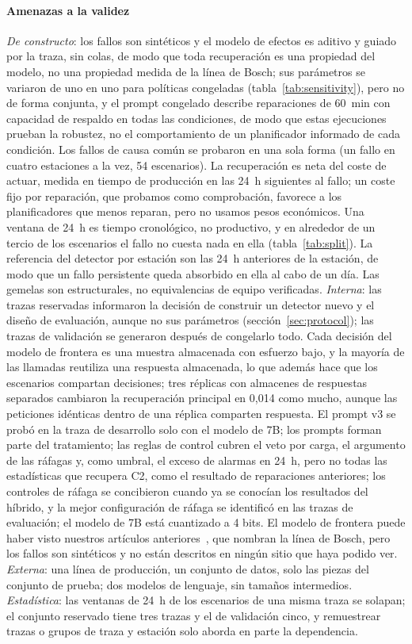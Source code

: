 \documentclass[preprint,11pt]{elsarticle}
\begin{document}
\paragraph{Amenazas a la validez}
\emph{De constructo}: los fallos son sintéticos y el modelo de efectos es aditivo y guiado por la traza, sin colas, de modo que toda recuperación es una propiedad del modelo, no una propiedad medida de la línea de Bosch; sus parámetros se variaron de uno en uno para políticas congeladas (tabla~\ref{tab:sensitivity}), pero no de forma conjunta, y el prompt congelado describe reparaciones de 60~min con capacidad de respaldo en todas las condiciones, de modo que estas ejecuciones prueban la robustez, no el comportamiento de un planificador informado de cada condición. Los fallos de causa común se probaron en una sola forma (un fallo en cuatro estaciones a la vez, 54 escenarios). La recuperación es neta del coste de actuar, medida en tiempo de producción en las 24~h siguientes al fallo; un coste fijo por reparación, que probamos como comprobación, favorece a los planificadores que menos reparan, pero no usamos pesos económicos. Una ventana de 24~h es tiempo cronológico, no productivo, y en alrededor de un tercio de los escenarios el fallo no cuesta nada en ella (tabla~\ref{tab:split}). La referencia del detector por estación son las 24~h anteriores de la estación, de modo que un fallo persistente queda absorbido en ella al cabo de un día. Las gemelas son estructurales, no equivalencias de equipo verificadas. \emph{Interna}: las trazas reservadas informaron la decisión de construir un detector nuevo y el diseño de evaluación, aunque no sus parámetros (sección~\ref{sec:protocol}); las trazas de validación se generaron después de congelarlo todo. Cada decisión del modelo de frontera es una muestra almacenada con esfuerzo bajo, y la mayoría de las llamadas reutiliza una respuesta almacenada, lo que además hace que los escenarios compartan decisiones; tres réplicas con almacenes de respuestas separados cambiaron la recuperación principal en 0{,}014 como mucho, aunque las peticiones idénticas dentro de una réplica comparten respuesta. El prompt v3 se probó en la traza de desarrollo solo con el modelo de 7B; los prompts forman parte del tratamiento; las reglas de control cubren el veto por carga, el argumento de las ráfagas y, como umbral, el exceso de alarmas en 24~h, pero no todas las estadísticas que recupera C2, como el resultado de reparaciones anteriores; los controles de ráfaga se concibieron cuando ya se conocían los resultados del híbrido, y la mejor configuración de ráfaga se identificó en las trazas de evaluación; el modelo de 7B está cuantizado a 4 bits. El modelo de frontera puede haber visto nuestros artículos anteriores~\cite{sanchez2020selfstar,sanchez2020jii}, que nombran la línea de Bosch, pero los fallos son sintéticos y no están descritos en ningún sitio que haya podido ver. \emph{Externa}: una línea de producción, un conjunto de datos, solo las piezas del conjunto de prueba; dos modelos de lenguaje, sin tamaños intermedios. \emph{Estadística}: las ventanas de 24~h de los escenarios de una misma traza se solapan; el conjunto reservado tiene tres trazas y el de validación cinco, y remuestrear trazas o grupos de traza y estación solo aborda en parte la dependencia.
\end{document}

